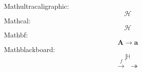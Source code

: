 \documentclass{article}
\begin{document}
Mathultracaligraphic:
\[
  \mathscr{H}%
 \]
Mathcal:
 \[
   \mathcal{H}%
 \]
Mathbf:
 \[
   \mathbf{A}\rightarrow\mathbf{a}
 \]
Mathblackboard:
\[
  \mathbb{H} 
\]
\[
  \xrightarrow{f}^{\circ}\twoheadrightarrow 
\]
\end{document}

